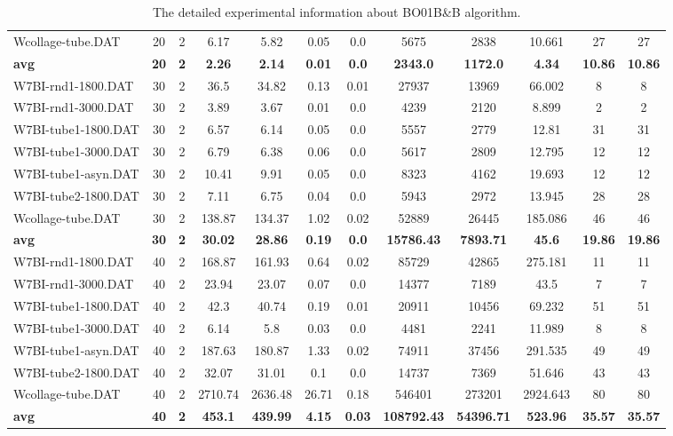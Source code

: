 \begin{table}[!h]
{\begin{tabular}{lccccccccccc}
Wcollage-tube.DAT & 20 & 2 & 6.17 & 5.82 & 0.05 & 0.0 & 5675 & 2838 & 10.661 & 27 & 27\\
\cline{1-12} \textbf{avg} & \textbf{20} & \textbf{2} & \textbf{2.26} & \textbf{2.14} & \textbf{0.01} & \textbf{0.0} & \textbf{2343.0} & \textbf{1172.0} & \textbf{4.34} & \textbf{10.86} & \textbf{10.86} \\ \cline{1-12}
W7BI-rnd1-1800.DAT & 30 & 2 & 36.5 & 34.82 & 0.13 & 0.01 & 27937 & 13969 & 66.002 & 8 & 8\\
W7BI-rnd1-3000.DAT & 30 & 2 & 3.89 & 3.67 & 0.01 & 0.0 & 4239 & 2120 & 8.899 & 2 & 2\\
W7BI-tube1-1800.DAT & 30 & 2 & 6.57 & 6.14 & 0.05 & 0.0 & 5557 & 2779 & 12.81 & 31 & 31\\
W7BI-tube1-3000.DAT & 30 & 2 & 6.79 & 6.38 & 0.06 & 0.0 & 5617 & 2809 & 12.795 & 12 & 12\\
W7BI-tube1-asyn.DAT & 30 & 2 & 10.41 & 9.91 & 0.05 & 0.0 & 8323 & 4162 & 19.693 & 12 & 12\\
W7BI-tube2-1800.DAT & 30 & 2 & 7.11 & 6.75 & 0.04 & 0.0 & 5943 & 2972 & 13.945 & 28 & 28\\
Wcollage-tube.DAT & 30 & 2 & 138.87 & 134.37 & 1.02 & 0.02 & 52889 & 26445 & 185.086 & 46 & 46\\
\cline{1-12} \textbf{avg} & \textbf{30} & \textbf{2} & \textbf{30.02} & \textbf{28.86} & \textbf{0.19} & \textbf{0.0} & \textbf{15786.43} & \textbf{7893.71} & \textbf{45.6} & \textbf{19.86} & \textbf{19.86} \\ \cline{1-12}
W7BI-rnd1-1800.DAT & 40 & 2 & 168.87 & 161.93 & 0.64 & 0.02 & 85729 & 42865 & 275.181 & 11 & 11\\
W7BI-rnd1-3000.DAT & 40 & 2 & 23.94 & 23.07 & 0.07 & 0.0 & 14377 & 7189 & 43.5 & 7 & 7\\
W7BI-tube1-1800.DAT & 40 & 2 & 42.3 & 40.74 & 0.19 & 0.01 & 20911 & 10456 & 69.232 & 51 & 51\\
W7BI-tube1-3000.DAT & 40 & 2 & 6.14 & 5.8 & 0.03 & 0.0 & 4481 & 2241 & 11.989 & 8 & 8\\
W7BI-tube1-asyn.DAT & 40 & 2 & 187.63 & 180.87 & 1.33 & 0.02 & 74911 & 37456 & 291.535 & 49 & 49\\
W7BI-tube2-1800.DAT & 40 & 2 & 32.07 & 31.01 & 0.1 & 0.0 & 14737 & 7369 & 51.646 & 43 & 43\\
Wcollage-tube.DAT & 40 & 2 & 2710.74 & 2636.48 & 26.71 & 0.18 & 546401 & 273201 & 2924.643 & 80 & 80\\
\cline{1-12} \textbf{avg} & \textbf{40} & \textbf{2} & \textbf{453.1} & \textbf{439.99} & \textbf{4.15} & \textbf{0.03} & \textbf{108792.43} & \textbf{54396.71} & \textbf{523.96} & \textbf{35.57} & \textbf{35.57} \\ \cline{1-12}
\bottomrule
\end{tabular}%
}%
\caption{The detailed experimental information about BO01B\&B algorithm.}
\label{tab:table_bb}
\end{table}

